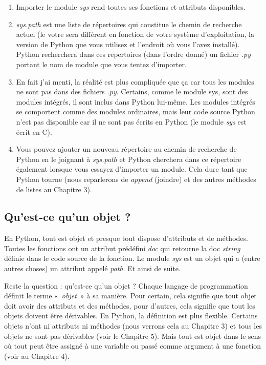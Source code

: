 \begin{enumerate}
\item{Importer le module \emph{sys} rend toutes ses fonctions et attributs disponibles.}
\item{\emph{sys.path} est une liste de répertoires qui constitue le chemin de recherche actuel (le votre sera différent en fonction de votre système d'exploitation, la version de Python que vous utilisez et l'endroit où vous l'avez installé). Python recherchera dans ces repertoires (dans l'ordre donné) un fichier \emph{.py} portant le nom de module que vous tentez d'importer.}
\item{En fait j'ai menti, la réalité est plus compliquée que ça car tous les modules ne sont pas dans des fichiers \emph{.py}. Certains, comme le module sys, sont des modules intégrés, il sont inclus dans Python lui-même. Les modules intégrés se comportent comme des modules ordinaires, mais leur code source Python n'est pas disponible car il ne sont pas écrits en Python (le module \emph{sys} est écrit en C).}
\item{Vous pouvez ajouter un nouveau répertoire au chemin de recherche de Python en le joignant à \emph{sys.path} et Python cherchera dans ce répertoire également lorsque vous essayez d'importer un module. Cela dure tant que Python tourne (nous reparlerons de \emph{append} (joindre) et des autres méthodes de listes au Chapitre 3).}
\end{enumerate}

\subsection{Qu'est-ce qu'un objet ?}

En Python, tout est objet et presque tout dispose d'attributs et de méthodes. Toutes les fonctions ont un attribut prédéfini \emph{doc} qui retourne la doc \emph{string} définie dans le code source de la fonction. Le module \emph{sys} est un objet qui a (entre autres choses) un attribut appelé \emph{path}. Et ainsi de suite.

Reste la question : qu'est-ce qu'un objet ? Chaque langage de programmation définit le terme «~\emph{objet}~» à sa manière. Pour certain, cela signifie que tout objet doit avoir des attributs et des méthodes, pour d'autres, cela signifie que tout les objets doivent être dérivables. En Python, la définition est plus flexible. Certains objets n'ont ni attributs ni méthodes (nous verrons cela au Chapitre 3) et tous les objets ne sont pas dérivables (voir le Chapitre 5). Mais tout est objet dans le sens où tout peut être assigné à une variable ou passé comme argument à une fonction (voir au Chapitre 4).

